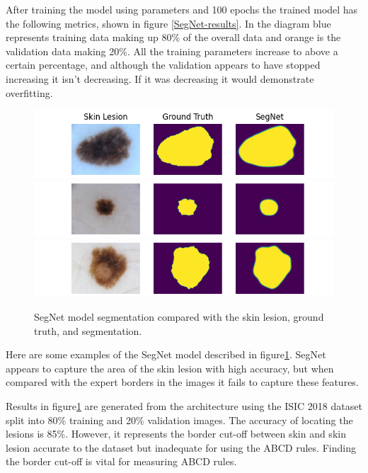 After training the model using parameters and 100 epochs the trained model has the following metrics, shown in figure \ref{SegNet-results}. In the diagram blue represents training data making up 80\% of the overall data and orange is the validation data making 20\%. All the training parameters increase to above a certain percentage, and although the validation appears to have stopped increasing it isn't decreasing. If it was decreasing it would demonstrate overfitting.

\begin{figure}[]
    \centering
    \includegraphics[scale=0.8]{images/segmentation/SegNet-1.png}
    \includegraphics[scale=0.8]{images/segmentation/SegNet-2.png}
    \includegraphics[scale=0.8]{images/segmentation/SegNet-3.png}
    \caption{SegNet model segmentation compared with the skin lesion, ground truth, and segmentation.}\label{SegNet-examples}
\end{figure}

Here are some examples of the SegNet model described in figure\ref{SegNet-examples}. SegNet appears to capture the area of the skin lesion with high accuracy, but when compared with the expert borders in the images it fails to capture these features.

Results in figure\ref{SegNet-examples} are generated from the architecture using the ISIC 2018 dataset split into 80\% training and 20\% validation images. The accuracy of locating the lesions is 85\%. However, it represents the border cut-off between skin and skin lesion accurate to the dataset but inadequate for using the ABCD rules. Finding the border cut-off is vital for measuring ABCD rules\cite{Pereira2020}.

